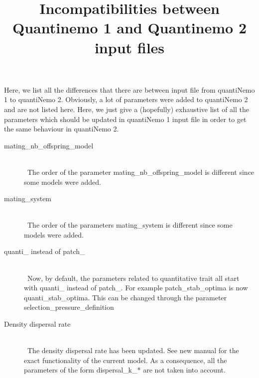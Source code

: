 \documentclass[letterpaper,12pt,oneside]{article}
\begin{document}
\title{Incompatibilities between Quantinemo 1 and Quantinemo 2 input files}
\maketitle
Here, we list all the differences that there are between input file from quantiNemo 1 to quantiNemo 2. Obviously, a lot of parameters were added to quantiNemo 2 and are not listed here. Here, we just give a (hopefully) exhaustive list of all the parameters which should be updated in quantiNemo 1 input file in order to get the same behaviour in quantiNemo 2. 
\begin{description}
\item[mating\_nb\_offspring\_model ]\hspace*{\fill}\\\
The order of the parameter \textsf{mating\_nb\_offspring\_model} is different since some models were added. 

\item[mating\_system]\hspace*{\fill}\\\
The order of the parameters \textsf{mating\_system} is different since some models were added. 

\item[quanti\_ instead of patch\_]\hspace*{\fill}\\\
Now, by default, the parameters related to quantitative trait all start with \textsf{quanti\_} instead of \textsf{patch\_}. For example \textsf{patch\_stab\_optima} is now \textsf{quanti\_stab\_optima}. This can be changed through the parameter \textsf{selection\_pressure\_definition}

\item[Density dispersal rate]\hspace*{\fill}\\\
The density dispersal rate has been updated. See new manual for the exact functionality of the current model. As a consequence, all the parameters of the form \textsf{dispersal\_k\_*} are not taken into account. 

\end{description}
\end{document}
